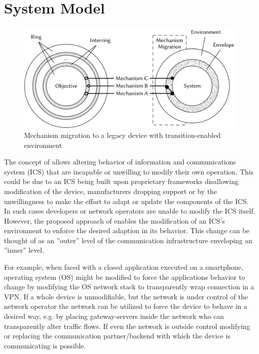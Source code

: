 \section{System Model}
\label{sec:design}

\begin{figure}
    \centering
    \includegraphics[width=\linewidth]{figures/MechanismMigration.pdf}
    \caption{Mechanism migration to a legacy device with transition-enabled environment}
    \label{fig:bigpicture}
\end{figure}

The concept of \emph{\mm} allows altering behavior of information and communications system (ICS) that are incapable or unwilling to modify their own operation.
This could be due to an ICS being built upon proprietary frameworks disallowing modification of the device, manufacturers dropping support or by the unwillingness to make the effort to adapt or update the components of the ICS.
In such cases developers or network operators are unable to modify the ICS itself.
However, the proposed approach of \mm enables the modification of an ICS's environment to enforce the desired adaption in its behavior.
This change can be thought of as an ''outer'' level of the communication infrastructure enveloping an ''inner'' level.

For example, when faced with a closed application executed on a smartphone, operating system (OS) might be modified to force the applications behavior to change by modifying the OS network stack to transparently wrap connection in a VPN.
If a whole device is unmodifiable, but the network is under control of the network operator the network can be utilized to force the device to behave in a desired way, e.g. by placing gateway-servers inside the network who can transparently alter traffic flows.
If even the network is outside control modifying or replacing the communication partner/backend with which the device is communicating is possible.


